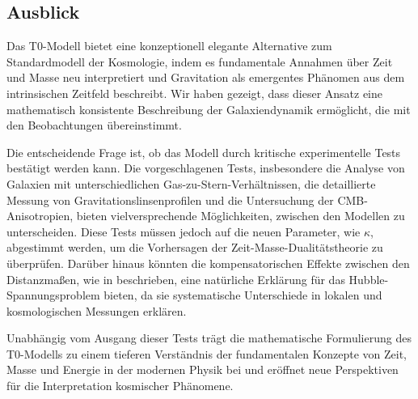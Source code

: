\documentclass[a4paper,12pt]{article}
\begin{document}
	\subsection{Ausblick}
	
	Das T0-Modell bietet eine konzeptionell elegante Alternative zum Standardmodell der Kosmologie, indem es fundamentale Annahmen über Zeit und Masse neu interpretiert und Gravitation als emergentes Phänomen aus dem intrinsischen Zeitfeld beschreibt. Wir haben gezeigt, dass dieser Ansatz eine mathematisch konsistente Beschreibung der Galaxiendynamik ermöglicht, die mit den Beobachtungen übereinstimmt.
	
	Die entscheidende Frage ist, ob das Modell durch kritische experimentelle Tests bestätigt werden kann. Die vorgeschlagenen Tests, insbesondere die Analyse von Galaxien mit unterschiedlichen Gas-zu-Stern-Verhältnissen, die detaillierte Messung von Gravitationslinsenprofilen und die Untersuchung der CMB-Anisotropien, bieten vielversprechende Möglichkeiten, zwischen den Modellen zu unterscheiden. Diese Tests müssen jedoch auf die neuen Parameter, wie \( \kappa \), abgestimmt werden, um die Vorhersagen der Zeit-Masse-Dualitätstheorie zu überprüfen. Darüber hinaus könnten die kompensatorischen Effekte zwischen den Distanzmaßen, wie in \cite{pascher_messdifferenzen_2025} beschrieben, eine natürliche Erklärung für das Hubble-Spannungsproblem bieten, da sie systematische Unterschiede in lokalen und kosmologischen Messungen erklären.
	
	Unabhängig vom Ausgang dieser Tests trägt die mathematische Formulierung des T0-Modells zu einem tieferen Verständnis der fundamentalen Konzepte von Zeit, Masse und Energie in der modernen Physik bei und eröffnet neue Perspektiven für die Interpretation kosmischer Phänomene.
	
\end{document}
